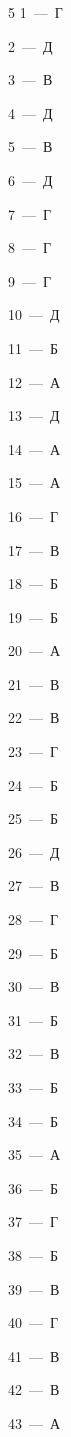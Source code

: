 \documentclass[12pt]{article}
\begin{document}
\begin{multicols}{5}\noindent
\mbox{1~--- Г}\par
\mbox{2~--- Д}\par
\mbox{3~--- В}\par
\mbox{4~--- Д}\par
\mbox{5~--- В}\par
\mbox{6~--- Д}\par
\mbox{7~--- Г}\par
\mbox{8~--- Г}\par
\mbox{9~--- Г}\par
\mbox{10~--- Д}\par
\mbox{11~--- Б}\par
\mbox{12~--- А}\par
\mbox{13~--- Д}\par
\mbox{14~--- А}\par
\mbox{15~--- А}\par
\mbox{16~--- Г}\par
\mbox{17~--- В}\par
\mbox{18~--- Б}\par
\mbox{19~--- Б}\par
\mbox{20~--- А}\par
\mbox{21~--- В}\par
\mbox{22~--- В}\par
\mbox{23~--- Г}\par
\mbox{24~--- Б}\par
\mbox{25~--- Б}\par
\mbox{26~--- Д}\par
\mbox{27~--- В}\par
\mbox{28~--- Г}\par
\mbox{29~--- Б}\par
\mbox{30~--- В}\par
\mbox{31~--- Б}\par
\mbox{32~--- В}\par
\mbox{33~--- Б}\par
\mbox{34~--- Б}\par
\mbox{35~--- А}\par
\mbox{36~--- Б}\par
\mbox{37~--- Г}\par
\mbox{38~--- Б}\par
\mbox{39~--- В}\par
\mbox{40~--- Г}\par
\mbox{41~--- В}\par
\mbox{42~--- В}\par
\mbox{43~--- А}\par

\end{multicols}
\end{document}
